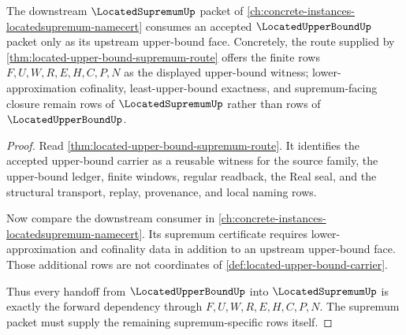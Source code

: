 \begin{theorem}
\label{thm:located-upper-bound-located-supremum-forward-dependency}
The downstream $\LocatedSupremumUp$ packet of \autoref{ch:concrete-instances-locatedsupremum-namecert} consumes an accepted $\LocatedUpperBoundUp$ packet only as its upstream upper-bound face. Concretely, the route supplied by \autoref{thm:located-upper-bound-supremum-route} offers the finite rows $F,U,W,R,E,H,C,P,N$ as the displayed upper-bound witness; lower-approximation cofinality, least-upper-bound exactness, and supremum-facing closure remain rows of $\LocatedSupremumUp$ rather than rows of $\LocatedUpperBoundUp$.
\end{theorem}
\begin{proof}
Read \autoref{thm:located-upper-bound-supremum-route}. It identifies the accepted upper-bound carrier as a reusable witness for the source family, the upper-bound ledger, finite windows, regular readback, the Real seal, and the structural transport, replay, provenance, and local naming rows.

Now compare the downstream consumer in \autoref{ch:concrete-instances-locatedsupremum-namecert}. Its supremum certificate requires lower-approximation and cofinality data in addition to an upstream upper-bound face. Those additional rows are not coordinates of \autoref{def:located-upper-bound-carrier}.

Thus every handoff from $\LocatedUpperBoundUp$ into $\LocatedSupremumUp$ is exactly the forward dependency through $F,U,W,R,E,H,C,P,N$. The supremum packet must supply the remaining supremum-specific rows itself.
\end{proof}
